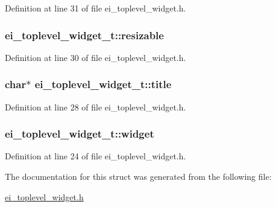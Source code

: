 Definition at line 31 of file ei\-\_\-toplevel\-\_\-widget.\-h.

\hypertarget{structei__toplevel__widget__t_a2f1fffc879dd73e27a0b70ff3a152fc5}{
\subsubsection[{resizable}]{ ei\-\_\-toplevel\-\_\-widget\-\_\-t\-::resizable}}\label{structei__toplevel__widget__t_a2f1fffc879dd73e27a0b70ff3a152fc5}


Definition at line 30 of file ei\-\_\-toplevel\-\_\-widget.\-h.

\hypertarget{structei__toplevel__widget__t_a6ed66d8c09149914ebf42fd122df33dc}{
\subsubsection[{title}]{\setlength{\rightskip}{0pt plus 5cm}char$\ast$ ei\-\_\-toplevel\-\_\-widget\-\_\-t\-::title}}\label{structei__toplevel__widget__t_a6ed66d8c09149914ebf42fd122df33dc}


Definition at line 28 of file ei\-\_\-toplevel\-\_\-widget.\-h.

\hypertarget{structei__toplevel__widget__t_a72894e216cd78fbfe56f6e834ece4385}{
\subsubsection[{widget}]{ ei\-\_\-toplevel\-\_\-widget\-\_\-t\-::widget}}\label{structei__toplevel__widget__t_a72894e216cd78fbfe56f6e834ece4385}


Definition at line 24 of file ei\-\_\-toplevel\-\_\-widget.\-h.



The documentation for this struct was generated from the following file\-:\begin{DoxyCompactItemize}
\item 
\hyperlink{ei__toplevel__widget_8h}{ei\-\_\-toplevel\-\_\-widget.\-h}\end{DoxyCompactItemize}
